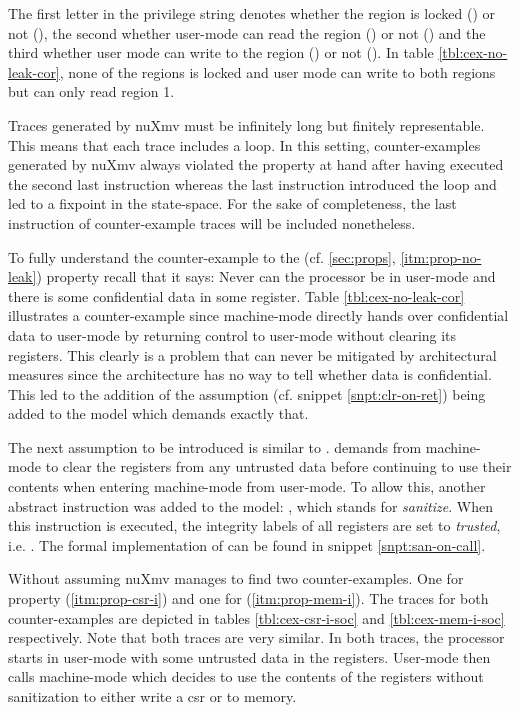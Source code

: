 The first letter in the privilege string denotes whether the region is locked () or not (\minrv{-}), the second whether user-mode can read the region () or not (\minrv{-}) and the third whether user mode can write to the region () or not (\minrv{-}).
In table \ref{tbl:cex-no-leak-cor}, none of the regions is locked and user mode can write to both regions but can only read region 1.

Traces generated by nuXmv must be infinitely long but finitely representable.
This means that each trace includes a loop.
In this setting, counter-examples generated by nuXmv always violated the property at hand after having executed the second last instruction whereas the last instruction introduced the loop and led to a fixpoint in the state-space.
For the sake of completeness, the last instruction of counter-example traces will be included nonetheless.

To fully understand the counter-example to the  (cf. \ref{sec:props}, \ref{itm:prop-no-leak}) property recall that it says: Never can the processor be in user-mode and there is some confidential data in some register.
Table \ref{tbl:cex-no-leak-cor} illustrates a counter-example since machine-mode directly hands over confidential data to user-mode by returning control to user-mode without clearing its registers.
This clearly is a problem that can never be mitigated by architectural measures since the architecture has no way to tell whether data is confidential.
This led to the addition of the assumption  (cf. snippet \ref{snpt:clr-on-ret}) being added to the model which demands exactly that.

The next assumption to be introduced is similar to .
 demands from machine-mode to clear the registers from any untrusted data before continuing to use their contents when entering machine-mode from user-mode.
To allow this, another abstract instruction was added to the model: , which stands for \textit{sanitize}.
When this instruction is executed, the integrity labels of all registers are set to \textit{trusted}, i.e. .
The formal implementation of  can be found in snippet \ref{snpt:san-on-call}.

Without assuming  nuXmv manages to find two counter-examples.
One for property  (\ref{itm:prop-csr-i}) and one for  (\ref{itm:prop-mem-i}).
The traces for both counter-examples are depicted in tables \ref{tbl:cex-csr-i-soc} and \ref{tbl:cex-mem-i-soc} respectively.
Note that both traces are very similar.
In both traces, the processor starts in user-mode with some untrusted data in the registers.
User-mode then calls machine-mode which decides to use the contents of the registers without sanitization to either write a \gls{csr} or to memory.


